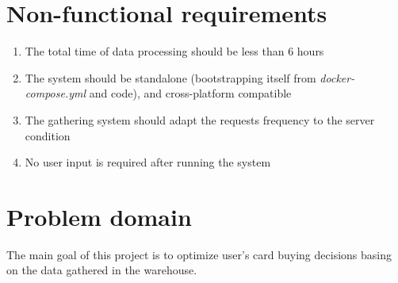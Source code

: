 \section{Non-functional requirements}
\begin{enumerate}
\item The total time of data processing should be less than 6 hours
\item The system should be standalone (bootstrapping itself from \textit{docker-compose.yml} and code), and cross-platform compatible
\item The gathering system should adapt the requests frequency to the server condition
\item No user input is required after running the system
\end{enumerate}


\section{Problem domain}
The main goal of this project is to optimize user's card buying decisions basing on the data gathered in the warehouse.

